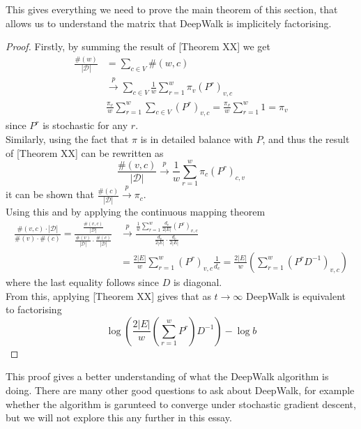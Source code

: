 \documentclass[a4paper]{article}
\newcommand{\D}{\mathcal D}
\begin{document}
This gives everything we need to prove the main theorem of this section, that
allows us to understand the matrix that DeepWalk is implicitely factorising.

\MainDeepWalk*

\begin{proof}
  Firstly, by summing the result of [Theorem XX] we get
  \begin{align*}
    \frac{\#(w)}{|\D|} &= \sum_{c \in V}\#(w, c)\\
                       &\overset{p}{\to} \sum_{c \in V} \frac{1}{w}\sum_{r=1}^w \pi_v(P^r)_{v, c}\\
                       &\frac{\pi_v}{w}\sum_{r = 1}^w \sum_{c \in V}(P^r)_{v,c} = \frac{\pi_v}{w}\sum_{r = 1}^w 1 = \pi_v
  \end{align*}
  since $P^r$ is stochastic for any $r$.\\
  Similarly, using the fact that $\pi$ is in detailed balance with $P$, and thus
  the result of [Theorem XX] can be rewritten as
  \[\frac{\#(v, c)}{|\D|} \overset{p}{\to} \frac{1}{w} \sum_{r = 1}^w \pi_c
    (P^r)_{c,v}\]
  it can be shown that $\frac{\#(c)}{|\D|} \overset{p}{\to} \pi_c$.\\
  Using this and by applying the continuous mapping theorem
  \begin{align*}
    \frac{\#(v, c) \cdot |\D|}{\#(v) \cdot \#(c)} = \frac{\frac{\#(v,c)}{|\D|}}{\frac{\#(v)}{|\D|} \cdot \frac{\#(c)}{|\D|}} & \overset{p}{\to} \frac{\frac{1}{w}\sum_{r=1}^{w} \frac{d_v}{2|E|}(P^r)_{v, c}}{\frac{d_v}{2|E|} \cdot \frac{d_c}{2|E|}}\\
                                                                                                                             &=\frac{2|E|}{w}\sum_{r=1}^w (P^r)_{v,c} \frac{1}{d_c} = \frac{2|E|}{w}\left( \sum_{r=1}^w(P^rD^{-1})_{v,c} \right)
  \end{align*}
  where the last equality follows since $D$ is diagonal.\\

  From this, applying [Theorem XX] gives that as $t \to \infty$ DeepWalk is equivalent to
  factorising
  \[\log \left( \frac{2|E|}{w}\left( \sum_{r=1}^w P^r \right)D^{-1}\right) - \log{b}\]
\end{proof}

This proof gives a better understanding of what the DeepWalk algorithm is doing.
There are many other good questions to ask about DeepWalk, for example whether
the algorithm is garunteed to converge under stochastic gradient descent, but we
will not explore this any further in this essay.
\end{document}
